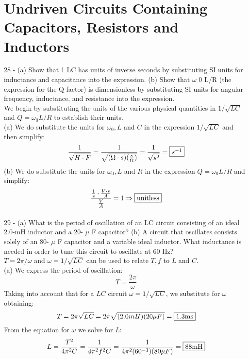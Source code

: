 \documentclass{report}
\begin{document}
\section{Undriven Circuits Containing Capacitors, Resistors and Inductors}
\paragraph{}
28 - (a) Show that 1 LC has units of inverse seconds by substituting SI
units for inductance and capacitance into the expression. (b) Show that $\omega$ 0 L/R (the expression for the Q-factor) is dimensionless by substituting SI units for angular frequency, inductance, and resistance into the expression.
\\
We begin by substituting the units of the various physical quantities in $1 / \sqrt{LC}$ and $Q = \omega{_0}L / R$ to establish their units.\\
(a) We do substitute the units for $\omega{_0}, L$ and $C$ in the expression $1 / \sqrt{LC}$ and then simplify:
$$\frac{1}{\sqrt{H\cdot F}} = \frac{1}{\sqrt{(\Omega \cdot s)(\frac{s}{\Omega})}} = \frac{1}{\sqrt{s^2}} = \fbox{$s^{-1}$}$$ 
(b) We do substitute the units for $\omega{_0}, L$ and $R$ in the expression $Q = \omega{_0}L / R$ and simplify:
$$\frac{\frac{1}{s} \cdot \frac{V \cdot s}{A}}{\frac{V}{A}} = 1 \Rightarrow \fbox{unitless}$$

\paragraph{}
29 - (a) What is the period of oscillation of an LC circuit consisting of an ideal 2.0-mH inductor and a 20- $\mu$ F capacitor? (b) A circuit that oscillates consists solely of an 80- $\mu$ F capacitor and a variable ideal inductor. What inductance is needed in order to tune this circuit to oscillate at 60 Hz?\\
$T = 2\pi / \omega$ and $\omega = 1 / \sqrt{LC}$ can be used to relate $T, f$ to $L$ and $C$.\\
(a) We express the period of oscillation:
$$T = \frac{2\pi}{\omega}$$
Taking into account that for a $LC$ circuit $\omega = 1 / \sqrt{LC}$, we substitute for $\omega$ obtaining:
$$T = 2\pi \sqrt{LC} = 2\pi \sqrt{(2.0mH)(20\mu F)} = \fbox{1.3ms}$$
From the equation for $\omega$ we solve for $L$:
$$L = \frac{T^2}{4\pi^2C} = \frac{1}{4\pi^2 f^2 C} = \frac{1}{4\pi^2 (60^{-1})(80\mu F)} = \fbox{88mH}$$
\end{document}
